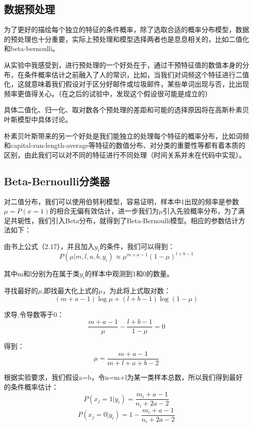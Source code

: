 \documentclass[hyperref,UTF8]{ctexart}
\begin{document}
\subsection{数据预处理}
\par
为了更好的描绘每个独立的特征的条件概率，除了选取合适的概率分布模型，数据的预处理也十分重要，实际上预处理和模型选择两者也是息息相关的，比如二值化和beta-bernoulli。
\par
从实验中我感受到，进行预处理的一个好处在于，通过干预特征值的数值本身的分布，在条件概率估计之前融入了人的常识，比如，当我们对词频这个特征进行二值化，这就意味着我们假设对于区分好邮件或垃圾邮件，某些单词出现与否，比出现频率更值得关心。（在之后的试验中，发现这个假设很可能是成立的）
\par
具体二值化、归一化、取对数各个预处理的差距和可能的选择原因将在高斯朴素贝叶斯模型中具体讨论。
\par 
朴素贝叶斯带来的另一个好处是我们能独立的处理每个特征的概率分布，比如词频和capital-run-length-average等特征的数值分布、对分类的重要性等都有着本质的区别，由此我们可以对不同的特征进行不同处理（时间关系并未在代码中实现）。

\subsection{Beta-Bernoulli分类器}
\par
对二值分布，我们可以使用伯努利模型，容易证明，样本中1出现的频率是参数$\mu = P(x=1)$的相合无偏有效估计，进一步我们为$\mu$引入先验概率分布，为了满足共轭性，我们引入Beta分布，就得到了Beta-Bernoulli模型。相应的参数估计方法如下：
\par
由书上公式（2.17），并且加入$y_{i}$的条件，我们可以得到：
\[P(\mu |m,l,a,b,y_{i})\propto \mu^{m+a-1}(1-\mu)^{l+b-1}\]
\par 其中m和l分别为在属于类$y_{i}$的样本中观测到1和0的数量。
\par
寻找最好的$\mu$,即找最大化上式的$\mu$，为此将上式取对数：
\[ (m+a-1)\log \mu+(l+b-1)\log (1-\mu)\]
\par 求导,令导数等于0：
\[\frac{m+a-1}{\mu}-\frac{l+b-1}{1-\mu}=0\]
\par 得到：
\[\mu=\frac{m+a-1}{m+l+a+b-2}\]
\par 根据实验要求，我们假设a=b，令n=m+l为某一类样本总数，所以我们得到最好的条件概率估计：
\[P(x_{j}=1|y_{i})=\frac{m_{i}+a-1}{n_{i}+2a-2}\]
\[P(x_{j}=0|y_{i})=1-\frac{m_{i}+a-1}{n_{i}+2a-2}\]
\end{document}
